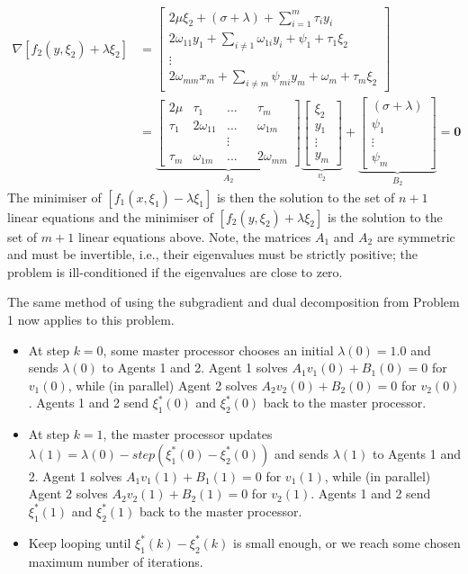 \documentclass[12pt]{article}
\begin{document}
\begin{align*}
\nabla [f_2(y,\xi_2)+\lambda\xi_2]&=\begin{bmatrix}2\mu\xi_2+(\sigma+\lambda)+\sum\limits_{i=1}^m \tau_iy_i\\2\omega_{11}y_1+\sum\limits_{i\neq1} \omega_{1i}y_i+\psi_1+\tau_1\xi_2\\ \vdots\\ 2\omega_{mm}x_m+\sum\limits_{i\neq m} \psi_{mi}y_m+\omega_m+\tau_m\xi_2\end{bmatrix}\\
&=\underbrace{\begin{bmatrix}2\mu&\tau_1&...&&\tau_m\\ \tau_1&2\omega_{11}&...&&\omega_{1m}\\&&\vdots\\ \tau_m&\omega_{1m}&...&&2\omega_{mm}\end{bmatrix}}_{A_2} \underbrace{\begin{bmatrix}\xi_2\\y_1\\ \vdots\\ y_m\end{bmatrix}}_{v_2}+\underbrace{\begin{bmatrix}(\sigma+\lambda)\\\psi_1\\ \vdots\\ \psi_m\end{bmatrix}}_{B_2}=\textbf{0}
\end{align*}
The minimiser of $[f_1(x,\xi_1)-\lambda\xi_1]$ is then the solution to the set of $n+1$ linear equations and the minimiser of $[f_2(y,\xi_2)+\lambda\xi_2]$ is the solution to the set of $m+1$ linear equations above. Note, the matrices $A_1$  and $A_2$ are symmetric and must be invertible, i.e., their eigenvalues must be strictly positive; the problem is ill-conditioned if the eigenvalues are close to zero.

The same method of using the subgradient and dual decomposition from Problem 1 now applies to this problem.
\begin{itemize}
	\item At step $k=0$, some master processor chooses an initial $\lambda(0)=1.0$ and sends $\lambda(0)$ to Agents 1 and 2. Agent 1 solves $A_1v_1(0)+B_1(0)=0$ for $v_1(0)$, while (in parallel) Agent 2 solves $A_2v_2(0)+B_2(0)=0$ for $v_2(0)$. Agents 1 and 2 send $\xi_1^*(0)$ and $\xi_2^*(0)$ back to the master processor.
	\item At step $k=1$, the master processor updates $\lambda(1)=\lambda(0)-step(\xi_1^*(0)-\xi_2^*(0))$ and sends $\lambda(1)$ to Agents 1 and 2. Agent 1 solves $A_1v_1(1)+B_1(1)=0$ for $v_1(1)$, while (in parallel) Agent 2 solves $A_2v_2(1)+B_2(1)=0$ for $v_2(1)$. Agents 1 and 2 send $\xi_1^*(1)$ and $\xi_2^*(1)$ back to the master processor.
	\item Keep looping until $\xi_1^*(k)-\xi_2^*(k)$ is small enough, or we reach some chosen maximum number of iterations.
\end{itemize}
\end{document}
